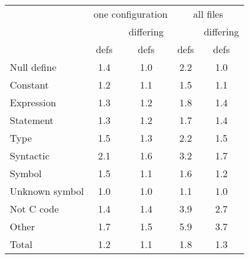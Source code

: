\begin{tabular}{|l|c|c|c|c|} \hline
 & \multicolumn{2}{c|}{one configuration}
 & \multicolumn{2}{c|}{all files} \\ \cline{2-5}
 & & \multicolumn{1}{c|}{differing} & & \multicolumn{1}{c|}{differing} \\
 & \multicolumn{1}{c|}{defs} & \multicolumn{1}{c|}{defs}
 & \multicolumn{1}{c|}{defs} & \multicolumn{1}{c|}{defs} \\ \hline
Null define &    1.4 & 1.0 & 2.2 & 1.0 \\
Constant &       1.2 & 1.1 & 1.5 & 1.1 \\
Expression &     1.3 & 1.2 & 1.8 & 1.4 \\
Statement &      1.3 & 1.2 & 1.7 & 1.4 \\
Type &           1.5 & 1.3 & 2.2 & 1.5 \\
Syntactic &      2.1 & 1.6 & 3.2 & 1.7 \\
Symbol &         1.5 & 1.1 & 1.6 & 1.2 \\
Unknown symbol & 1.0 & 1.0 & 1.1 & 1.0 \\
Not C code &     1.4 & 1.4 & 3.9 & 2.7 \\
Other &          1.7 & 1.5 & 5.9 & 3.7 \\ \hline
Total &          1.2 & 1.1 & 1.8 & 1.3 \\ \hline
\end{tabular}


